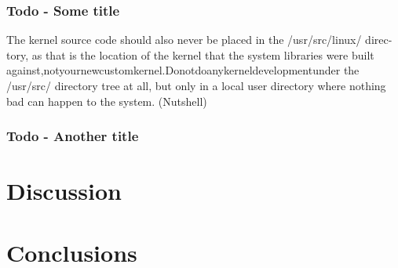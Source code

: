 \documentclass{article}
\begin{document}
\subsubsection{Todo - Some title}
\lipsum[1]
The kernel source code should also never be placed in the /usr/src/linux/ direc- tory, as that is the location of the kernel that the system libraries were built against,notyournewcustomkernel.Donotdoanykerneldevelopmentunder the /usr/src/ directory tree at all, but only in a local user directory where nothing bad can happen to the system.
(Nutshell)

\subsubsection{Todo - Another title}
\lipsum[1]


\section{Discussion}
\lipsum[1]

\section{Conclusions}
\lipsum[1]


\vspace{-7.5mm}
\renewcommand{\refname}{\section{References}}

\end{document}

